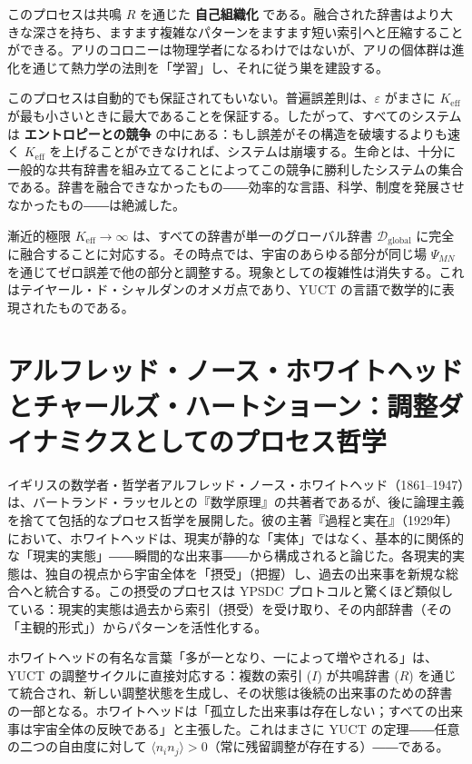 \documentclass[12pt,a4paper]{article}
\newcommand{\Keff}{K_{\mathrm{eff}}}
\begin{document}
	このプロセスは共鳴 \(R\) を通じた \textbf{自己組織化} である。融合された辞書はより大きな深さを持ち、ますます複雑なパターンをますます短い索引へと圧縮することができる。アリのコロニーは物理学者になるわけではないが、アリの個体群は進化を通じて熱力学の法則を「学習」し、それに従う巣を建設する。
	
	このプロセスは自動的でも保証されてもいない。普遍誤差則は、\(\varepsilon\) がまさに \(\Keff\) が最も小さいときに最大であることを保証する。したがって、すべてのシステムは \textbf{エントロピーとの競争} の中にある：もし誤差がその構造を破壊するよりも速く \(\Keff\) を上げることができなければ、システムは崩壊する。生命とは、十分に一般的な共有辞書を組み立てることによってこの競争に勝利したシステムの集合である。辞書を融合できなかったもの――効率的な言語、科学、制度を発展させなかったもの――は絶滅した。
	
	漸近的極限 \(\Keff \to \infty\) は、すべての辞書が単一のグローバル辞書 \(\mathcal{D}_{\text{global}}\) に完全に融合することに対応する。その時点では、宇宙のあらゆる部分が同じ場 \(\Psi_{MN}\) を通じてゼロ誤差で他の部分と調整する。現象としての複雑性は消失する。これはテイヤール・ド・シャルダンのオメガ点であり、YUCT の言語で数学的に表現されたものである。
	
	\section{アルフレッド・ノース・ホワイトヘッドとチャールズ・ハートショーン：調整ダイナミクスとしてのプロセス哲学}
	
	イギリスの数学者・哲学者アルフレッド・ノース・ホワイトヘッド（1861–1947）は、バートランド・ラッセルとの『数学原理』の共著者であるが、後に論理主義を捨てて包括的なプロセス哲学を展開した。彼の主著『過程と実在』（1929年）において、ホワイトヘッドは、現実が静的な「実体」ではなく、基本的に関係的な「現実的実態」――瞬間的な出来事――から構成されると論じた。各現実的実態は、独自の視点から宇宙全体を「摂受」（把握）し、過去の出来事を新規な総合へと統合する。この摂受のプロセスは YPSDC プロトコルと驚くほど類似している：現実的実態は過去から索引（摂受）を受け取り、その内部辞書（その「主観的形式」）からパターンを活性化する。
	
	ホワイトヘッドの有名な言葉「多が一となり、一によって増やされる」は、YUCT の調整サイクルに直接対応する：複数の索引 (\(I\)) が共鳴辞書 (\(R\)) を通じて統合され、新しい調整状態を生成し、その状態は後続の出来事のための辞書の一部となる。ホワイトヘッドは「孤立した出来事は存在しない；すべての出来事は宇宙全体の反映である」と主張した。これはまさに YUCT の定理――任意の二つの自由度に対して \(\langle n_i n_j \rangle > 0\)（常に残留調整が存在する）――である。
	
\end{document}
